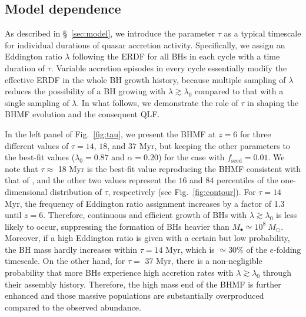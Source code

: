 \documentclass[twocolumn, twocolappendix]{aastex63}
\newcommand{\Msun}{M_\odot}
\newcommand{\tlife}{\tau}
\newcommand{\fseed}{f_\mathrm{seed}}
\begin{document}
\begin{CJK*}{UTF8}{gbsn}
\vspace{2mm}
\section{Model dependence}\label{sec:modep}
As described in \S~\ref{sec:model}, we introduce the parameter $\tau$ as a typical timescale
for individual durations of quasar accretion activity.
Specifically, we assign an Eddington ratio $\lambda$ following the ERDF for all BHs in each cycle
with a time duration of $\tau$.
Variable accretion episodes in every cycle essentially modify the effective ERDF in the whole BH growth history,
because multiple sampling of $\lambda$ reduces the possibility of a BH growing with $\lambda \gtrsim \lambda_0$
compared to that with a single sampling of $\lambda$.
In what follows, we demonstrate the role of $\tlife$ in shaping the BHMF evolution and the consequent QLF.

In the left panel of Fig.~\ref{fig:tau}, we present the BHMF at $z=6$ for three different values of $\tlife=14$, $18$, and $37$ Myr,
but keeping the other parameters to the best-fit values ($\lambda_0=0.87$ and $\alpha=0.20$) for the case with $\fseed=0.01$.
We note that $\tlife \approx$ 18 Myr is the best-fit value reproducing the BHMF consistent with that of ,
and the other two values represent the $16$ and $84$ percentiles of the one-dimensional distribution of $\tau$, respectively (see Fig.~\ref{fig:contour}).
For $\tlife=14$ Myr, the frequency of Eddington ratio assignment increases by a factor of 1.3 until $z=6$.
Therefore, continuous and efficient growth of BHs with $\lambda \gtrsim \lambda_0$ is less likely to occur,
suppressing the formation of BHs heavier than $M_\bullet \simeq 10^8~\Msun$.
Moreover, if a high Eddington ratio is given with a certain but low probability, the BH mass hardly increases
within $\tlife=14$ Myr, which is $\simeq 30\%$ of the $e$-folding timescale.
On the other hand, for $\tlife=$ 37 Myr, there is a non-negligible probability that
more BHs experience high accretion rates with $\lambda\gtrsim \lambda_0$ through their assembly history.
Therefore, the high mass end of the BHMF is further enhanced and those massive populations are substantially
overproduced compared to the observed abundance.


\end{CJK*}
\end{document}
